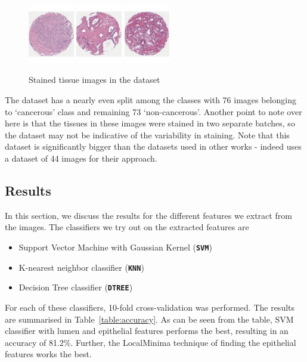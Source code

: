 \begin{figure}
\includegraphics[width=2.0cm]{figs/41_red.pdf}
\includegraphics[width=2.0cm]{figs/108_green.pdf}
\includegraphics[width=2.0cm]{figs/109_red.pdf}
\caption{Stained tissue images in the dataset}
\label{fig:TissueImageExample}

\end{figure}  
  

The dataset has a nearly even split among the classes with 76 images belonging to `cancerous' class and remaining 73 `non-cancerous'. Another point to note over here is that the tissues in these images were stained in two separate batches, so the dataset may not be indicative of the variability in staining. Note that this dataset is significantly bigger than the datasets used in other works - indeed \cite{naik2007gland} uses a dataset of 44 images for their approach.


\subsection{Results}
In this section, we discuss the results for the different features we extract from the images. The classifiers we try out on the extracted features are 
\begin{itemize}
\item Support Vector Machine with Gaussian Kernel (\textbf{\texttt{SVM}})
\item K-nearest neighbor classifier (\textbf{\texttt{KNN}})
\item Decision Tree classifier (\textbf{\texttt{DTREE}})
\end{itemize}
For each of these classifiers, 10-fold cross-validation was performed. The results are summarised in Table~\ref{table:accuracy}. As can be seen from the table, SVM classifier with lumen and epithelial features performs the best, resulting in an accuracy of 81.2\%. Further, the LocalMinima technique of finding the epithelial features works the best. 

